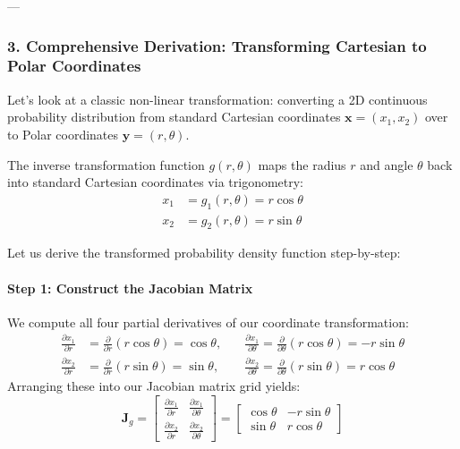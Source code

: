 \documentclass{article}
\begin{document}
---

\subsubsection*{3. Comprehensive Derivation: Transforming Cartesian to Polar Coordinates}

Let's look at a classic non-linear transformation: converting a 2D continuous probability distribution from standard Cartesian coordinates $\mathbf{x} = (x_1, x_2)$ over to Polar coordinates $\mathbf{y} = (r, \theta)$.

The inverse transformation function $g(r, \theta)$ maps the radius $r$ and angle $\theta$ back into standard Cartesian coordinates via trigonometry:
\begin{align*}
x_1 &= g_1(r, \theta) = r \cos \theta \\
x_2 &= g_2(r, \theta) = r \sin \theta
\end{align*}

Let us derive the transformed probability density function step-by-step:

\paragraph{Step 1: Construct the Jacobian Matrix}
We compute all four partial derivatives of our coordinate transformation:
\begin{align*}
\frac{\partial x_1}{\partial r} &= \frac{\partial}{\partial r}(r \cos \theta) = \cos \theta, \quad & \frac{\partial x_1}{\partial \theta} = \frac{\partial}{\partial \theta}(r \cos \theta) = -r \sin \theta \\
\frac{\partial x_2}{\partial r} &= \frac{\partial}{\partial r}(r \sin \theta) = \sin \theta, \quad & \frac{\partial x_2}{\partial \theta} = \frac{\partial}{\partial \theta}(r \sin \theta) = r \cos \theta
\end{align*}
Arranging these into our Jacobian matrix grid yields:
\begin{equation}
\mathbf{J}_g = 
\begin{bmatrix}
\frac{\partial x_1}{\partial r} & \frac{\partial x_1}{\partial \theta} \\
\frac{\partial x_2}{\partial r} & \frac{\partial x_2}{\partial \theta}
\end{bmatrix} =
\begin{bmatrix}
\cos \theta & -r \sin \theta \\
\sin \theta & r \cos \theta
\end{bmatrix} \tag{217}
\end{equation}
\end{document}

